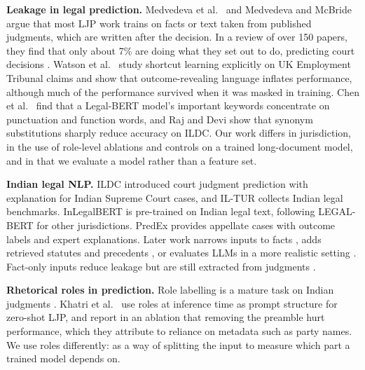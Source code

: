 \documentclass[conference]{IEEEtran}
\begin{document}
\textbf{Leakage in legal prediction.} Medvedeva et al.\ \cite{medvedeva2023rethinking} and Medvedeva and McBride \cite{medvedeva2023mcbride} argue that most LJP work trains on facts or text taken from published judgments, which are written after the decision. In a review of over 150 papers, they find that only about 7\% are doing what they set out to do, predicting court decisions \cite{medvedeva2023mcbride}. Watson et al.\ \cite{watson2026shortcut} study shortcut learning explicitly on UK Employment Tribunal claims and show that outcome-revealing language inflates performance, although much of the performance survived when it was masked in training. Chen et al.\ \cite{chen2023knowledge} find that a Legal-BERT model's important keywords concentrate on punctuation and function words, and Raj and Devi \cite{raj2023adversarially} show that synonym substitutions sharply reduce accuracy on ILDC. Our work differs in jurisdiction, in the use of role-level ablations and controls on a trained long-document model, and in that we evaluate a model rather than a feature set.

\textbf{Indian legal NLP.} ILDC \cite{malik2021ildc} introduced court judgment prediction with explanation for Indian Supreme Court cases, and IL-TUR \cite{joshi2024iltur} collects Indian legal benchmarks. InLegalBERT \cite{paul2023pre} is pre-trained on Indian legal text, following LEGAL-BERT \cite{chalkidis2020legalbert} for other jurisdictions. PredEx \cite{nigam2024predex} provides appellate cases with outcome labels and expert explanations. Later work narrows inputs to facts \cite{nigam2025tathyanyaya}, adds retrieved statutes and precedents \cite{patnaik2025nyayarag}, or evaluates LLMs in a more realistic setting \cite{nigam2024rethinking}. Fact-only inputs reduce leakage but are still extracted from judgments \cite{medvedeva2023mcbride}.

\textbf{Rhetorical roles in prediction.} Role labelling is a mature task on Indian judgments \cite{nigam2025legalseg}. Khatri et al.\ \cite{khatri2025structured} use roles at inference time as prompt structure for zero-shot LJP, and report in an ablation that removing the preamble hurt performance, which they attribute to reliance on metadata such as party names. We use roles differently: as a way of splitting the input to measure which part a trained model depends on.
\end{document}
